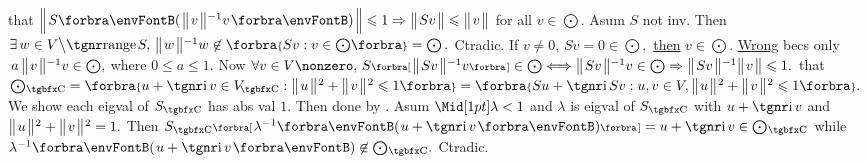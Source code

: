 \NOTICE that $\BigDvert{S\Par{\Dvert{v}{^{-1}}v}}\leqslant 1\Rightarrow\Dvert{Sv}\leqslant\Dvert{v}$ for all $v\in\bigodot.$\parSol{}
Asum $S$ not inv. Then $\exists\,w\in V\Backslash\range S,\,\Dvert{w}{^{-1}}w\not\in\Bra{Sv:v\in\bigodot\!}=\bigodot.$ Ctradic.\parSol{}
\ANote If $v\neq0,\,Sv=0\in\bigodot,$ \uline{then} $v\in\bigodot.$ \;\uline{Wrong} becs only $\,a\,\big\Vert\hspace{1pt}{}v{}\hspace{1pt}\big\Vert{^{-1}}v\in\bigodot,$ where $0\leqslant a\leqslant1.$\vspace{4pt}\parSol{}
Now $\forall v\in V\nonzero,\,S\Sbra{\Dvert{Sv}{^{-1}}v}\in\bigodot\Longleftrightarrow\Dvert{Sv}{^{-1}}v\in\bigodot\Rightarrow\Dvert{Sv}{^{-1}}\Dvert{v}\leqslant1.$\PfEnd\vspace{2pt}\parSol{}
\Or \NOTICE that \,$\bigodot{_{\!\Cbb}}=\Bra{u+\i\,v\in V_{\!\Cbb}:\Dvertsq{u}+\Dvertsq{v}\leqslant1}=\Bra{Su+\i\,Sv:u,v\in V,\Dvertsq{u}+\Dvertsq{v}\leqslant 1}.$\parSol{}
We show each eigval of $S_{\Cbb}$ has abs val $1.$ Then done by \TIPS.\parSol{}
Asum $\aMid{\lambda}<1$ and $\lambda$ is eigval of $S_{\Cbb}$ with $u+\i\,v$ and $\big\Vert\hspace{1pt}{}u{}\hspace{1pt}\big\Vert{\hspace{0.5pt}}{^2}+\big\Vert\hspace{1pt}{}v{}\hspace{1pt}\big\Vert{\hspace{0.5pt}}{^2}=1.$\parSol{}
Then $S_{\Cbb}\Sbra{\lambda^{-1}\Par{u+\i\,v}}=u+\i\,v\in\bigodot{_{\!\Cbb}}$ while $\lambda^{-1}\Par{u+\i\,v}\not\in\bigodot{_{\!\Cbb}}.$ Ctradic.\PfEnd
\SepLine
\ChEnd


\pagebreak

